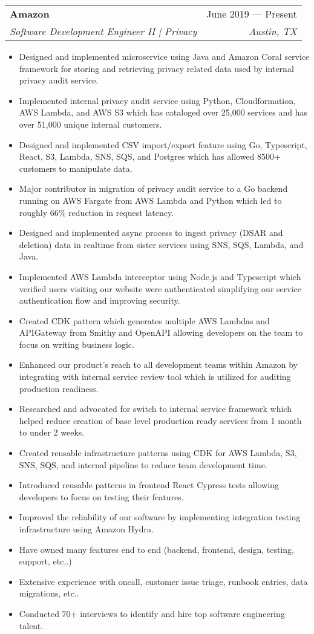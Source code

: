 \documentclass[letterpaper,11pt]{article}
\makeatletter
\newcommand{\resumeItem}[1]{
  \item\small{
    {#1 \vspace{-2pt}}
  }
}
\newcommand{\resumeSubheading}[4]{
  \vspace{-2pt}\item
    \begin{tabular*}{0.97\textwidth}[t]{l@{\extracolsep{\fill}}r}
      \textbf{#1} & #2 \\
      \textit{\small#3} & \textit{\small #4} \\
    \end{tabular*}\vspace{-7pt}
}
\newcommand{\resumeItemListStart}{\begin{itemize}}
\newcommand{\resumeItemListEnd}{\end{itemize}\vspace{-5pt}}
\makeatother
\begin{document}
    \resumeSubheading{Amazon}{June 2019 --- Present}{Software Development Engineer II | Privacy}{Austin, TX}
      \resumeItemListStart{}
        \resumeItem{Designed and implemented microservice using Java and Amazon Coral service framework for storing and retrieving privacy related data used by internal privacy audit service.}
        \resumeItem{Implemented internal privacy audit service using Python, Cloudformation, AWS Lambda, and AWS S3 which has cataloged over 25,000 services and has over 51,000 unique internal customers.}  
        \resumeItem{Designed and implemented CSV import/export feature using Go, Typescript, React, S3, Lambda, SNS, SQS, and Postgres which has allowed 8500+ customers to manipulate data.}
        \resumeItem{Major contributor in migration of privacy audit service to a Go backend running on AWS Fargate from AWS Lambda and Python which led to roughly 66\% reduction in request latency.}
        \resumeItem{Designed and implemented async process to ingest privacy (DSAR and deletion) data in realtime from sister services using SNS, SQS, Lambda, and Java.}
        \resumeItem{Implemented AWS Lambda interceptor using Node.js and Typescript which verified users visiting our website were authenticated simplifying our service authentication flow and improving security.}
        \resumeItem{Created CDK pattern which generates multiple AWS Lambdas and APIGateway from Smithy and OpenAPI allowing developers on the team to focus on writing business logic.}
        \resumeItem{Enhanced our product’s reach to all development teams within Amazon by integrating with internal service review tool which is utilized for auditing production readiness.}
        \resumeItem{Researched and advocated for switch to internal service framework which helped reduce creation of base level production ready services from 1 month to under 2 weeks.}
        \resumeItem{Created reusable infrastructure patterns using CDK for AWS Lambda, S3, SNS, SQS, and internal pipeline to reduce team development time.}
        \resumeItem{Introduced reusable patterns in frontend React Cypress tests allowing developers to focus on testing their features.}
        \resumeItem{Improved the reliability of our software by implementing integration testing infrastructure using Amazon Hydra.}
        \resumeItem{Have owned many features end to end (backend, frontend, design, testing, support, etc..)}
        \resumeItem{Extensive experience with oncall, customer issue triage, runbook entries, data migrations, etc..}
        \resumeItem{Conducted 70+ interviews to identify and hire top software engineering talent.}
      \resumeItemListEnd{}
      
\end{document}
